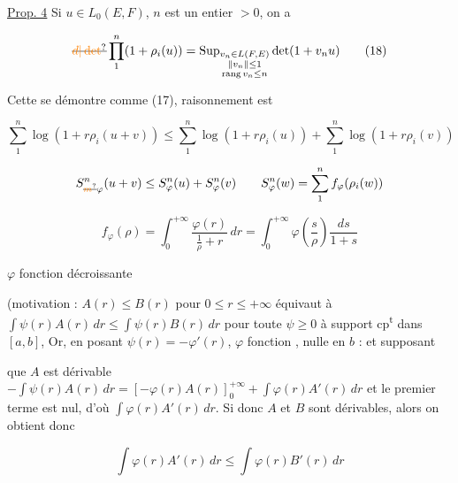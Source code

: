 \uline{Prop. 4} Si $u\in L_0(E,F)$,  $n$ est un entier $>0$, on a

\[
\deleted{\unsure{d|\det}}\prod_1^n(1+\rho_i(u))=\operatorname{Sup}_{\substack{v_n\in L(F,E)\\\lVert v_n\rVert\leq1\\\operatorname{rang}v_n\leq n}}\det(1+v_nu)\tag*{(18)}
\]

Cette   se démontre comme (17),   raisonnement est  

\[
\sum_1^n\log(1+r\rho_i(u+v))\leq\sum_1^n\log(1+r\rho_i(u))+\sum_1^n\log(1+r\rho_i(v))
\]

\[
S_{\deleted{\unsure{m}}\varphi}^{n}(u+v)\leq S_\varphi^n(u)+S_\varphi^n(v)\qquad S_\varphi^n(w)=\sum_1^n f_\varphi(\rho_i(w))
\]

\[
f_\varphi(\rho)=\int_0^{+\infty}\frac{\varphi(r)}{\frac1\rho+r}\,dr=\int_0^{+\infty}\varphi\left(\frac s\rho\right)\frac{ds}{1+s}
\]

$\varphi$ fonction décroissante

(motivation :  $A(r)\leq B(r)$ pour $0\leq r\leq+\infty$ équivaut à $\int\psi(r)A(r)\,dr\leq\int\psi(r)B(r)\,dr$ pour toute $\psi\geq0$ à support cp\textsuperscript{t} dans $[a,b]$, Or, en posant $\psi(r)=-\varphi'(r)$, $\varphi$ fonction  , nulle en $b$ :   et supposant 

que $A$ est dérivable $-\int\psi(r)A(r)\,dr=[-\varphi(r)A(r)]_0^{+\infty}+\int\varphi(r)A'(r)\,dr$ et le premier terme est nul, d'où $\int\varphi(r)A'(r)\,dr$. Si donc $A$ et $B$ sont dérivables, alors on obtient donc

\[
\int\varphi(r)A'(r)\,dr\leq\int\varphi(r)B'(r)\,dr
\]

